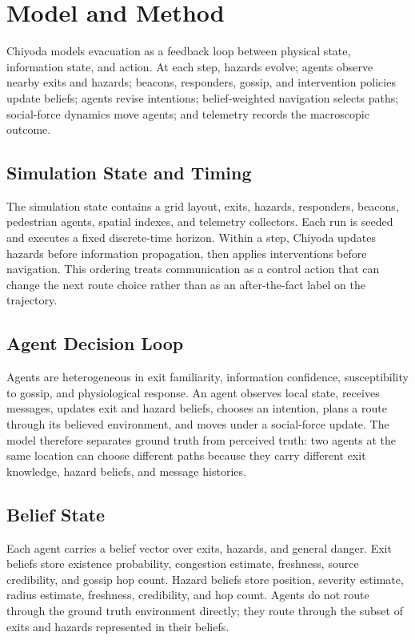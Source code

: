 \section{Model and Method}
\label{sec:design}

Chiyoda models evacuation as a feedback loop between physical state,
information state, and action. At each step, hazards evolve; agents observe
nearby exits and hazards; beacons, responders, gossip, and intervention
policies update beliefs; agents revise intentions; belief-weighted navigation
selects paths; social-force dynamics move agents; and telemetry records the
macroscopic outcome.

\subsection{Simulation State and Timing}
\label{subsec:state-timing}

The simulation state contains a grid layout, exits, hazards, responders,
beacons, pedestrian agents, spatial indexes, and telemetry collectors. Each run
is seeded and executes a fixed discrete-time horizon. Within a step, Chiyoda
updates hazards before information propagation, then applies interventions
before navigation. This ordering treats communication as a control action that
can change the next route choice rather than as an after-the-fact label on the
trajectory.

\subsection{Agent Decision Loop}
\label{subsec:agent-loop}

Agents are heterogeneous in exit familiarity, information confidence,
susceptibility to gossip, and physiological response. An agent observes local
state, receives messages, updates exit and hazard beliefs, chooses an
intention, plans a route through its believed environment, and moves under a
social-force update. The model therefore separates ground truth from perceived
truth: two agents at the same location can choose different paths because they
carry different exit knowledge, hazard beliefs, and message histories.

\subsection{Belief State}
\label{subsec:beliefs}

Each agent carries a belief vector over exits, hazards, and general danger.
Exit beliefs store existence probability, congestion estimate, freshness,
source credibility, and gossip hop count. Hazard beliefs store position,
severity estimate, radius estimate, freshness, credibility, and hop count.
Agents do not route through the ground truth environment directly; they route
through the subset of exits and hazards represented in their beliefs.


